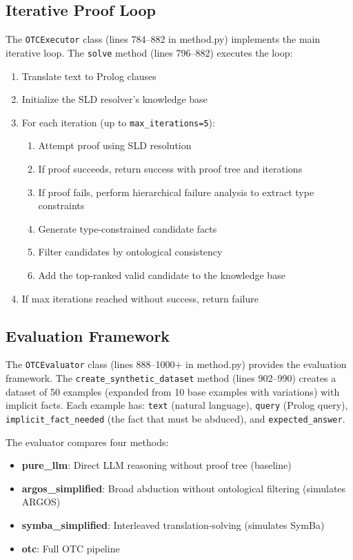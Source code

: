 \documentclass[11pt,letterpaper]{article}
\begin{document}
\subsection{Iterative Proof Loop}

The \texttt{OTCExecutor} class (lines 784--882 in method.py) implements the main iterative loop. The \texttt{solve} method (lines 796--882) executes the loop:

\begin{enumerate}
    \item Translate text to Prolog clauses
    \item Initialize the SLD resolver's knowledge base
    \item For each iteration (up to \texttt{max\_iterations=5}):
    \begin{enumerate}
        \item[a.] Attempt proof using SLD resolution
        \item[b.] If proof succeeds, return success with proof tree and iterations
        \item[c.] If proof fails, perform hierarchical failure analysis to extract type constraints
        \item[d.] Generate type-constrained candidate facts
        \item[e.] Filter candidates by ontological consistency
        \item[f.] Add the top-ranked valid candidate to the knowledge base
    \end{enumerate}
    \item If max iterations reached without success, return failure
\end{enumerate}

\subsection{Evaluation Framework}

The \texttt{OTCEvaluator} class (lines 888--1000+ in method.py) provides the evaluation framework. The \texttt{create\_synthetic\_dataset} method (lines 902--990) creates a dataset of 50 examples (expanded from 10 base examples with variations) with implicit facts. Each example has: \texttt{text} (natural language), \texttt{query} (Prolog query), \texttt{implicit\_fact\_needed} (the fact that must be abduced), and \texttt{expected\_answer}.

The evaluator compares four methods:
\begin{itemize}
    \item \textbf{pure\_llm}: Direct LLM reasoning without proof tree (baseline)
    \item \textbf{argos\_simplified}: Broad abduction without ontological filtering (simulates ARGOS)
    \item \textbf{symba\_simplified}: Interleaved translation-solving (simulates SymBa)
    \item \textbf{otc}: Full OTC pipeline
\end{itemize}
\end{document}
